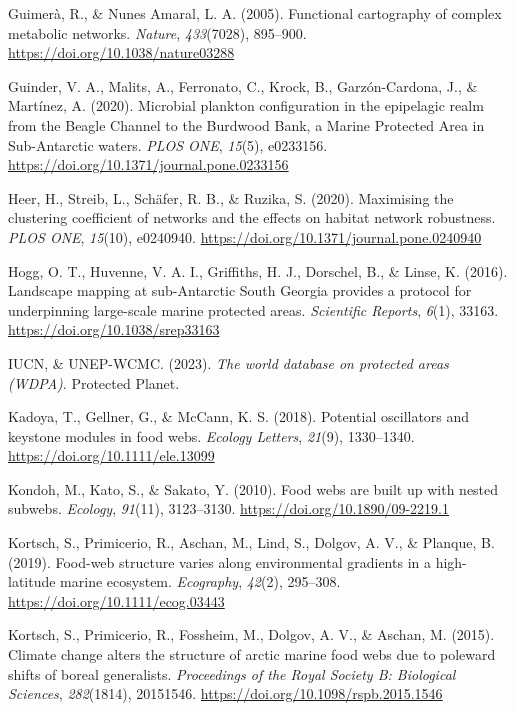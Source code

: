 \documentclass[preprint, 3p,
authoryear]{elsarticle} %
\newlength{\cslhangindent}
\newlength{\cslentryspacingunit} %
\newenvironment{CSLReferences}[2] %
 {%
  \setlength{\parindent}{0pt}
  \ifodd #1
  \let\oldpar\par
  \def\par{\hangindent=\cslhangindent\oldpar}
  \fi
  \setlength{\parskip}{#2\cslentryspacingunit}
 }%
 {}
\begin{document}
\begin{CSLReferences}{1}{0}
\leavevmode{}%
Guimerà, R., \& Nunes Amaral, L. A. (2005). Functional cartography of
complex metabolic networks. \emph{Nature}, \emph{433}(7028), 895--900.
\url{https://doi.org/10.1038/nature03288}

\leavevmode{}%
Guinder, V. A., Malits, A., Ferronato, C., Krock, B., Garzón-Cardona,
J., \& Martínez, A. (2020). Microbial plankton configuration in the
epipelagic realm from the {Beagle Channel} to the {Burdwood Bank}, a
{Marine Protected Area} in {Sub-Antarctic} waters. \emph{PLOS ONE},
\emph{15}(5), e0233156.
\url{https://doi.org/10.1371/journal.pone.0233156}

\leavevmode{}%
Heer, H., Streib, L., Schäfer, R. B., \& Ruzika, S. (2020). Maximising
the clustering coefficient of networks and the effects on habitat
network robustness. \emph{PLOS ONE}, \emph{15}(10), e0240940.
\url{https://doi.org/10.1371/journal.pone.0240940}

\leavevmode{}%
Hogg, O. T., Huvenne, V. A. I., Griffiths, H. J., Dorschel, B., \&
Linse, K. (2016). Landscape mapping at sub-{Antarctic South Georgia}
provides a protocol for underpinning large-scale marine protected areas.
\emph{Scientific Reports}, \emph{6}(1), 33163.
\url{https://doi.org/10.1038/srep33163}

\leavevmode{}%
IUCN, \& UNEP-WCMC. (2023). \emph{The world database on protected areas
({WDPA})}. {Protected Planet}.

\leavevmode{}%
Kadoya, T., Gellner, G., \& McCann, K. S. (2018). Potential oscillators
and keystone modules in food webs. \emph{Ecology Letters}, \emph{21}(9),
1330--1340. \url{https://doi.org/10.1111/ele.13099}

\leavevmode{}%
Kondoh, M., Kato, S., \& Sakato, Y. (2010). Food webs are built up with
nested subwebs. \emph{Ecology}, \emph{91}(11), 3123--3130.
\url{https://doi.org/10.1890/09-2219.1}

\leavevmode{}%
Kortsch, S., Primicerio, R., Aschan, M., Lind, S., Dolgov, A. V., \&
Planque, B. (2019). Food-web structure varies along environmental
gradients in a high-latitude marine ecosystem. \emph{Ecography},
\emph{42}(2), 295--308. \url{https://doi.org/10.1111/ecog.03443}

\leavevmode{}%
Kortsch, S., Primicerio, R., Fossheim, M., Dolgov, A. V., \& Aschan, M.
(2015). Climate change alters the structure of arctic marine food webs
due to poleward shifts of boreal generalists. \emph{Proceedings of the
Royal Society B: Biological Sciences}, \emph{282}(1814), 20151546.
\url{https://doi.org/10.1098/rspb.2015.1546}


\end{CSLReferences}
\end{document}
